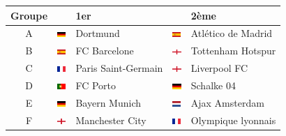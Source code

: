 \documentclass{../ficheTDTP}
\begin{document}
\begin{tabular}{|c|ll|ll|}
\hline
Groupe & & 1er & & 2ème \\ \hline
A & \includegraphics[height=0.2cm]{flags/de.png} & Dortmund & \includegraphics[height=0.2cm]{flags/es.png} & Atlético de Madrid \\ \hline
B & \includegraphics[height=0.2cm]{flags/es.png} & FC Barcelone & \includegraphics[height=0.2cm]{flags/en.png} & Tottenham Hotspur \\ \hline
C & \includegraphics[height=0.2cm]{flags/fr.png} & Paris Saint-Germain & \includegraphics[height=0.2cm]{flags/en.png} & Liverpool FC \\ \hline
D & \includegraphics[height=0.2cm]{flags/po.png} & FC Porto & \includegraphics[height=0.2cm]{flags/de.png} & Schalke 04 \\ \hline
E & \includegraphics[height=0.2cm]{flags/de.png} & Bayern Munich & \includegraphics[height=0.2cm]{flags/nl.png} & Ajax Amsterdam \\ \hline
F & \includegraphics[height=0.2cm]{flags/en.png} & Manchester City & \includegraphics[height=0.2cm]{flags/fr.png} & Olympique lyonnais \\ \hline

\end{tabular}
\end{document}
